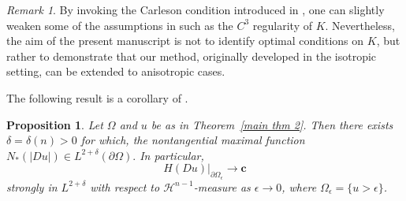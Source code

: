 \documentclass[reqno,11pt]{amsart}
\makeatletter
\def\ez{\epsilon}
\newtheorem{prop}[thm]{Proposition}%
\numberwithin{equation}{section}
\theoremstyle{remark}
\newtheorem{rem}[thm]{Remark}%
\makeatother
\begin{document}
\begin{rem}
By invoking the Carleson condition introduced in \cite{DPR2017}, one can slightly weaken some of the assumptions in  such as the $C^3$ regularity of $K$. Nevertheless, the aim of the present manuscript is not to identify optimal conditions on $K$, but rather to demonstrate that our method, originally developed in the isotropic setting, can be extended to anisotropic cases. 
\end{rem}


The following result is a corollary of \cite[Theorem 2.10]{DPR2017}. 

\begin{prop}\label{KP}
    Let $\Omega$ and $u$  be  as in Theorem~\ref{main thm 2}. Then there exists $\delta=\delta(n)>0$ for which,  the nontangential maximal function 
    $N_*(|Du|)\in L^{2+\delta }(\partial\Omega).$
    In particular, 
    $$H(Du)\bigg|_{\partial \Omega_\ez} \to \mathbf{c}$$
      strongly in $L^{2+\delta}$ with respect to $\mathscr H^{n-1}$-measure as $\ez\to 0$, where $\Omega_\ez=\{u>\ez\}$. 
\end{prop}
\end{document}

